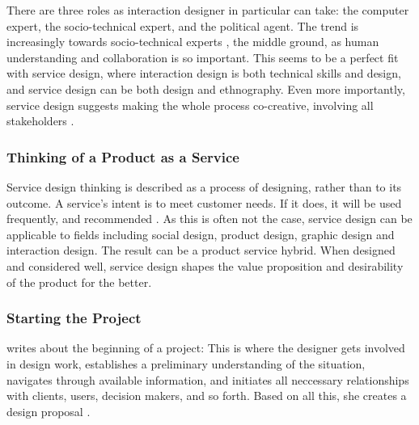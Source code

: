 There are three roles as interaction designer in particular can take: the computer expert, the socio-technical expert, and the political agent. The trend is increasingly towards socio-technical experts \citep{lowgren}, the middle ground, as human understanding and collaboration is so important. This seems to be a perfect fit with service design, where interaction design is both technical skills and design, and service design can be both design and ethnography. Even more importantly, service design suggests making the whole process co-creative, involving all stakeholders \citep{stickdorn}.

\subsubsection{Thinking of a Product as a Service}

Service design thinking is described as a process of designing, rather than to its outcome. A service's intent is to meet customer needs. If it does, it will be used frequently, and recommended \citep{stickdorn}. As this is often not the case, service design can be applicable to fields including social design, product design, graphic design and interaction design. The result can be a product service hybrid. When designed and considered well, service design shapes the value proposition and desirability of the product for the better.

\subsubsection{Starting the Project}

\cite{lowgren} writes about the beginning of a project: This is where the designer gets involved in design work, establishes a preliminary understanding of the situation, navigates through available information, and initiates all neccessary relationships with clients, users, decision makers, and so forth. Based on all this, she creates a design proposal \citep{lowgren}.
